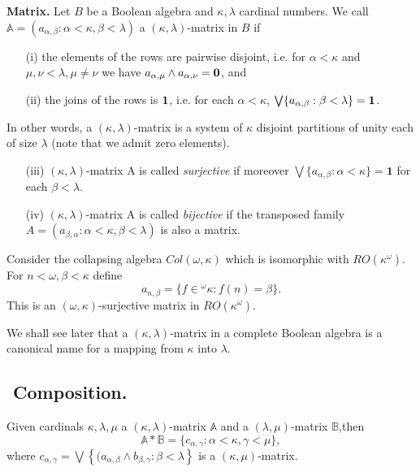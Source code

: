\begin{definition}\label{matrix}{\bf Matrix.} Let $B$ be a Boolean algebra and $\kappa,\lambda$ cardinal numbers. We call ${\mathbb A}=(a_{\alpha,\beta}:\alpha<\kappa,\beta<\lambda)$
a $(\kappa,\lambda)$-matrix in $B$ if
\begin{itemize}
\item[(i)] the elements of the rows are pairwise disjoint, i.e. for $\alpha<\kappa$ and $\mu,\nu<\lambda, \mu\neq\nu$ we have $a_{\alpha,\mu}\wedge a_{\alpha,\nu}=\hbox{\bf 0}$, and
\item[(ii)] the joins of the rows is $\hbox{\bf 1}$, i.e. for each $\alpha<\kappa$, $\bigvee\{a_{\alpha,\beta}:\beta<\lambda\}=\hbox{\bf 1}$.
\end{itemize}
In other words, a $(\kappa,\lambda)$-matrix is a system of $\kappa$ disjoint partitions of unity each of size $\lambda$ (note that we admit zero elements).
\begin{itemize}
 \item[(iii)] $(\kappa,\lambda)$-matrix A is called \emph{surjective}
	if moreover $\bigvee \{a_{\alpha,\beta}:\alpha<\kappa\} = \mathbf 1$
	for each $\beta < \lambda$.
  \item[(iv)] $(\kappa,\lambda)$-matrix A is called \emph{bijective} if
	the transposed family $A = (a_{\beta,\alpha}:\alpha<\kappa,\beta<\lambda)$
	is also a matrix.
\end{itemize}

\end{definition}

\begin{example} Consider the collapsing algebra $Col(\omega,\kappa)$ which is isomorphic with $RO(\kappa^\omega)$. For $n<\omega,\beta<\kappa$ define
$$
a_{n,\beta}=\{f\in{}^\omega\kappa:f(n)=\beta\}.
$$
This is an $(\omega,\kappa)$-surjective matrix in $RO(\kappa^\omega)$.
\end{example}


We shall see later that a $(\kappa,\lambda)$-matrix in a complete Boolean algebra is a canonical name for a mapping from $\kappa$ into $\lambda$.

\subsection{${}$ \hspace{-1em}Composition.}\label{superposition} Given cardinals $\kappa,\lambda,\mu$ a $(\kappa,\lambda)$-matrix ${\mathbb A}$ and a $(\lambda,\mu)$-matrix ${\mathbb B}$,then
$$
{\mathbb A}*{\mathbb B}=\{c_{\alpha,\gamma}:\alpha<\kappa,\gamma<\mu\},
$$
where
$
c_{\alpha,\gamma}=\bigvee\left\{(a_{\alpha,\beta}\wedge b_{\beta,\gamma}:\beta<\lambda\right\}
$
is a $(\kappa,\mu)$-matrix.


